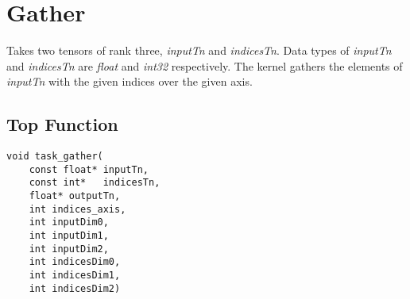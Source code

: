 \begin{enumerate}
\begin{figure}[h]
\end{figure}

\end{enumerate}










\clearpage








\section{Gather}
Takes two tensors of rank three, \emph{inputTn} and \emph{indicesTn}. Data types of \emph{inputTn} and \emph{indicesTn} are \emph{float} and \emph{int32} respectively. The kernel gathers the elements of \emph{inputTn} with the given indices over the given axis.

\subsection{Top Function}
\begin{lstlisting}
void task_gather(
	const float* inputTn,
	const int*   indicesTn,
	float* outputTn,
	int indices_axis,
	int inputDim0,
	int inputDim1,
	int inputDim2,
	int indicesDim0,
	int indicesDim1,
	int indicesDim2)
\end{lstlisting}

